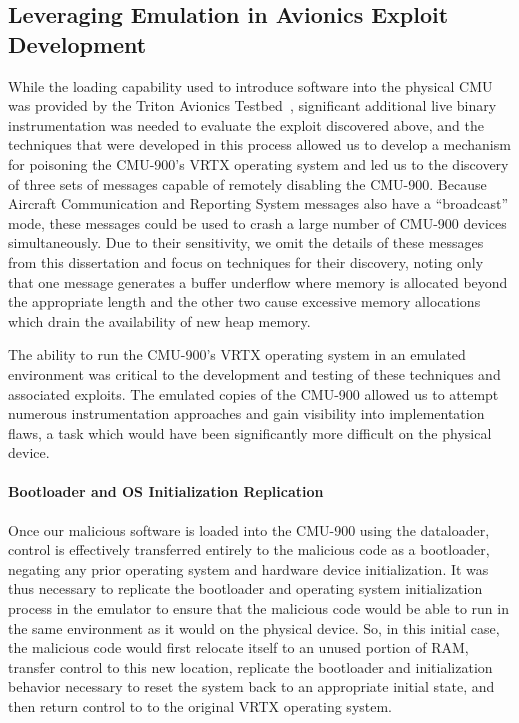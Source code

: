 \subsection{Leveraging Emulation in Avionics Exploit Development}
\label{sec:jetset-attack}
\label{sec:cmu-attack}

While the loading capability used to introduce software into the physical CMU was provided by the Triton Avionics Testbed~\cite{crow2019triton}, significant additional live binary instrumentation was needed to evaluate the exploit discovered above, and the techniques that were developed in this process allowed us to develop a mechanism for poisoning the CMU-900's VRTX operating system and led us to the discovery of three sets of messages capable of remotely disabling the CMU-900.
Because Aircraft Communication and Reporting System messages also have a ``broadcast'' mode, these messages could be used to crash a large number of CMU-900 devices simultaneously.
Due to their sensitivity, we omit the details of these messages from this dissertation and focus on techniques for their discovery, noting only that one message generates a buffer underflow where memory is allocated beyond the appropriate length and the other two cause excessive memory allocations which drain the availability of new heap memory.

The ability to run the CMU-900's VRTX operating system in an emulated environment was critical to the development and testing of these techniques and associated exploits.
The emulated copies of the CMU-900 allowed us to attempt numerous instrumentation approaches and gain visibility into implementation flaws, a task which would have been significantly more difficult on the physical device.

\paragraph{Bootloader and OS Initialization Replication}
Once our malicious software is loaded into the CMU-900 using the dataloader, control is effectively transferred entirely to the malicious code as a bootloader, negating any prior operating system and hardware device initialization.
It was thus necessary to replicate the bootloader and operating system initialization process in the emulator to ensure that the malicious code would be able to run in the same environment as it would on the physical device.
So, in this initial case, the malicious code would first relocate itself to an unused portion of RAM, transfer control to this new location, replicate the bootloader and initialization behavior necessary to reset the system back to an appropriate initial state, and then return control to to the original VRTX operating system.

